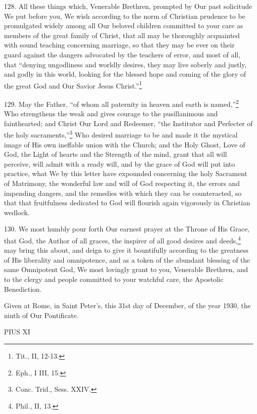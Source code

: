 \documentclass[12pt,a4paper]{book}
\begin{document}
128. All these things which, Venerable Brethren, prompted by Our past solicitude We put before you, We wish according to the norm of Christian prudence to be promulgated widely among all Our beloved children committed to your care as members of the great family of Christ, that all may be thoroughly acquainted with sound teaching concerning marriage, so that they may be ever on their guard against the dangers advocated by the teachers of error, and most of all, that ``denying ungodliness and worldly desires, they may live soberly and justly, and godly in this world, looking for the blessed hope and coming of the glory of the great God and Our Savior Jesus Christ.''\footnote{Tit., II, 12-13.}

129. May the Father, ``of whom all paternity in heaven and earth is named,''\footnote{Eph., I III, 15.} Who strengthens the weak and gives courage to the pusillanimous and fainthearted; and Christ Our Lord and Redeemer, ``the Institutor and Perfecter of the holy sacraments,''\footnote{Conc. Trid., Sess. XXIV.} Who desired marriage to be and made it the mystical image of His own ineffable union with the Church; and the Holy Ghost, Love of God, the Light of hearts and the Strength of the mind, grant that all will perceive, will admit with a ready will, and by the grace of God will put into practice, what We by this letter have expounded concerning the holy Sacrament of Matrimony, the wonderful law and will of God respecting it, the errors and impending dangers, and the remedies with which they can be counteracted, so that that fruitfulness dedicated to God will flourish again vigorously in Christian wedlock.

130. We most humbly pour forth Our earnest prayer at the Throne of His Grace, that God, the Author of all graces, the inspirer of all good desires and deeds,\footnote{Phil., II, 13.} may bring this about, and deign to give it bountifully according to the greatness of His liberality and omnipotence, and as a token of the abundant blessing of the same Omnipotent God, We most lovingly grant to you, Venerable Brethren, and to the clergy and people committed to your watchful care, the Apostolic Benediction.

Given at Rome, in Saint Peter's, this 31st day of December, of the year 1930, the ninth of Our Pontificate.

PIUS XI
\end{document}
